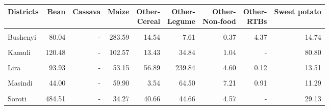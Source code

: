 \begin{table}[!h]
\centering\begingroup\fontsize{7}{9}\selectfont

\begin{tabular}{>{\raggedright\arraybackslash}p{1.8cm}rrrrrrrr}
\toprule
Districts & Bean & Cassava & Maize & \makecell{Other-\\Cereal} & \makecell{Other-\\Legume} & \makecell{Other-\\Non-food} & \makecell{Other-\\RTBs} & Sweet potato\\
\midrule
\cellcolor{gray!10}{Apac} & \cellcolor{gray!10}{139.37} & \cellcolor{gray!10}{2.87} & \cellcolor{gray!10}{112.23} & \cellcolor{gray!10}{31.51} & \cellcolor{gray!10}{207.06} & \cellcolor{gray!10}{18.11} & \cellcolor{gray!10}{0.44} & \cellcolor{gray!10}{19.13}\\
Bushenyi & 80.04 & - & 283.59 & 14.54 & 7.61 & 0.37 & 4.37 & 14.74\\
\cellcolor{gray!10}{Gulu} & \cellcolor{gray!10}{69.49} & \cellcolor{gray!10}{-} & \cellcolor{gray!10}{9.81} & \cellcolor{gray!10}{13.07} & \cellcolor{gray!10}{70.44} & \cellcolor{gray!10}{2.13} & \cellcolor{gray!10}{0.01} & \cellcolor{gray!10}{6.70}\\
Kamuli & 120.48 & - & 102.57 & 13.43 & 34.84 & 1.04 & - & 80.80\\
\cellcolor{gray!10}{Katakwi} & \cellcolor{gray!10}{30.22} & \cellcolor{gray!10}{-} & \cellcolor{gray!10}{138.28} & \cellcolor{gray!10}{16.67} & \cellcolor{gray!10}{33.62} & \cellcolor{gray!10}{0.53} & \cellcolor{gray!10}{-} & \cellcolor{gray!10}{8.92}\\
\addlinespace
Lira & 93.93 & - & 53.15 & 56.89 & 239.84 & 4.60 & 0.12 & 13.51\\
\cellcolor{gray!10}{Luwero} & \cellcolor{gray!10}{14.28} & \cellcolor{gray!10}{-} & \cellcolor{gray!10}{32.53} & \cellcolor{gray!10}{91.84} & \cellcolor{gray!10}{174.62} & \cellcolor{gray!10}{3.23} & \cellcolor{gray!10}{0.83} & \cellcolor{gray!10}{3.33}\\
Masindi & 44.00 & - & 59.90 & 3.54 & 64.50 & 7.21 & 0.91 & 11.29\\
\cellcolor{gray!10}{Mbarara} & \cellcolor{gray!10}{87.40} & \cellcolor{gray!10}{-} & \cellcolor{gray!10}{47.45} & \cellcolor{gray!10}{3.64} & \cellcolor{gray!10}{20.03} & \cellcolor{gray!10}{-} & \cellcolor{gray!10}{30.14} & \cellcolor{gray!10}{0.51}\\
Soroti & 484.51 & - & 34.27 & 40.66 & 44.66 & 4.57 & - & 29.13\\
\bottomrule
\end{tabular}
\endgroup{}
\end{table}

